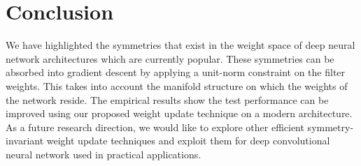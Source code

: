 \documentclass{article} %
\newcommand{\changeBM}[1]{#1} %
\newcommand{\changeVB}[1]{#1} %
\begin{document}



%
%







\section{Conclusion}
\label{Conclusion}
We have highlighted the symmetries that exist in the weight space of deep neural network architectures which are currently popular. \changeVB{These symmetries can be absorbed into gradient descent by applying a unit-norm constraint on the filter weights. This takes into account the manifold structure on which the weights of the network reside. The empirical results show the test performance can be improved using our proposed weight update technique on a modern architecture}. \changeBM{As a future research direction,} we would \changeVB{like to explore other efficient symmetry-invariant weight update techniques and exploit them for deep convolutional neural network \changeBM{used in} practical applications}.
\end{document}

